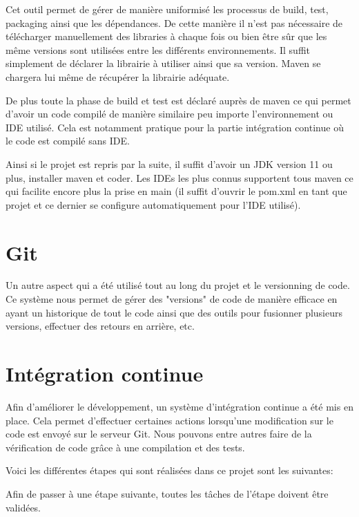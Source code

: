 \documentclass[final, noposter]{polytech/polytech}
\begin{document}
		Cet outil permet de gérer de manière uniformisé les processus de build, test, packaging ainsi que les dépendances.
		De cette manière il n'est pas nécessaire de télécharger manuellement des libraries à chaque fois ou bien être sûr que les même versions sont utilisées entre les différents environnements.
		Il suffit simplement de déclarer la librairie à utiliser ainsi que sa version.
		Maven se chargera lui même de récupérer la librairie adéquate.
		
		De plus toute la phase de build et test est déclaré auprès de maven ce qui permet d'avoir un code compilé de manière similaire peu importe l'environnement ou IDE utilisé.
		Cela est notamment pratique pour la partie intégration continue où le code est compilé sans IDE.
		
		Ainsi si le projet est repris par la suite, il suffit d'avoir un JDK version 11 ou plus, installer maven et coder.
		Les IDEs les plus connus supportent tous maven ce qui facilite encore plus la prise en main (il suffit d'ouvrir le pom.xml en tant que projet et ce dernier se configure automatiquement pour l'IDE utilisé).
	
		
	\section{Git}
		Un autre aspect qui a été utilisé tout au long du projet et le versionning de code.
		Ce système nous permet de gérer des "versions" de code de manière efficace en ayant un historique de tout le code ainsi que des outils pour fusionner plusieurs versions, effectuer des retours en arrière, etc.
		
	\section{Intégration continue} 
		Afin d'améliorer le développement, un système d'intégration continue a été mis en place.
	Cela permet d'effectuer certaines actions lorsqu'une modification sur le code est envoyé sur le serveur Git.
	Nous pouvons entre autres faire de la vérification de code grâce à une compilation et des tests.
	
	Voici les différentes étapes qui sont réalisées dans ce projet sont les suivantes:
	
	Afin de passer à une étape suivante, toutes les tâches de l'étape doivent être validées.
		
\end{document}
